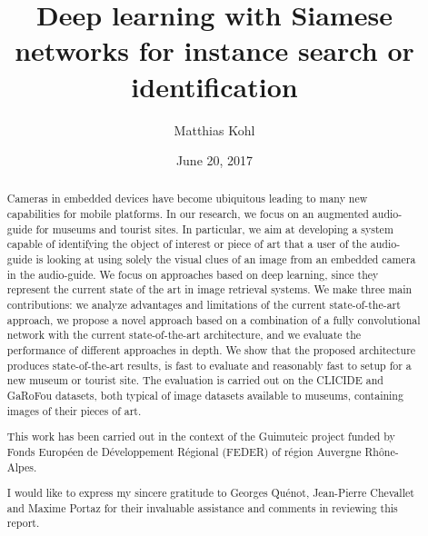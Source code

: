 \documentclass[12pt, a4paper]{memoir} %
\title{Deep learning with Siamese networks for instance search or identification} %
\author{Matthias Kohl}
\date{June 20, 2017} %
\begin{document}
\frontmatter
\begin{titlingpage}
\maketitle
\end{titlingpage}

\setlength{\parskip}{-1pt plus 1pt}

\renewcommand{\abstracttextfont}{\normalfont}
\abstractintoc
\begin{abstract}
Cameras in embedded devices have become ubiquitous leading to many new
capabilities for mobile platforms. In our research, we focus on an augmented
audio-guide for museums and tourist sites. In particular, we aim at
developing a system capable of identifying the object of interest or
piece of art that a user of the audio-guide is looking at using solely
the visual clues of an image from an embedded camera in the audio-guide.
We focus on approaches based on deep learning, since they represent the
current state of the art in image retrieval systems.
We make three main contributions:
we analyze advantages and limitations of the current state-of-the-art
approach, we propose a novel approach based on a combination of a fully
convolutional network with the current state-of-the-art architecture,
and we evaluate the performance of different approaches in depth.
We show that the proposed architecture produces state-of-the-art results,
is fast to evaluate and reasonably fast to setup for a new museum or
tourist site. The evaluation is carried out on the CLICIDE and GaRoFou
datasets, both typical of image datasets available to museums,
containing images of their pieces of art.
\end{abstract}
\abstractintoc

\renewcommand\abstractname{Acknowledgement}
\begin{abstract}
This work has been carried out in the context of the Guimuteic project
funded by Fonds Européen de Développement Régional (FEDER) of région
Auvergne Rhône-Alpes.

I would like to express my sincere gratitude to Georges Quénot,
Jean-Pierre Chevallet and Maxime Portaz for their invaluable assistance
and comments in reviewing this report.
\end{abstract}
\end{document}
